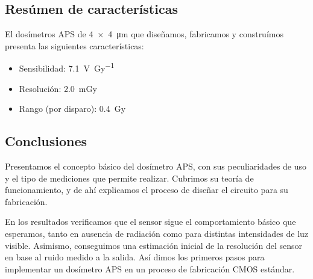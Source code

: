\subsection{Resúmen de características}
El dosímetros APS de \SI{4x4}{\micro\meter} que diseñamos, 
fabricamos y construímos presenta las
siguientes características:
\begin{itemize}
    \item Sensibilidad: \SI{7.1}{\volt\per\gray}
    \item Resolución: \SI{2.0}{\milli\gray}
    \item Rango (por disparo): \SI{0.4}{\gray}
\end{itemize}
%
\subsection{Conclusiones}
Presentamos el concepto básico del dosímetro APS,
con sus peculiaridades de uso y el tipo de mediciones que permite realizar.
Cubrimos su teoría de funcionamiento,
y de ahí explicamos el proceso de diseñar el circuito
para su fabricación.

En los resultados verificamos que el sensor
sigue el comportamiento básico que esperamos,
tanto en ausencia de radiación 
como para distintas intensidades de luz visible.
Asimismo, conseguimos una estimación inicial de la resolución del sensor
en base al ruido medido a la salida.
Así dimos los primeros pasos para implementar un dosímetro APS
en un proceso de fabricación CMOS estándar.
